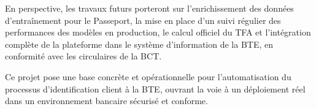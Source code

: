 \documentclass[12pt,a4paper]{report}
\begin{document}
En perspective, les travaux futurs porteront sur l'enrichissement des données d'entraînement pour le Passeport, la mise en place d'un suivi régulier des performances des modèles en production, le calcul officiel du TFA et l'intégration complète de la plateforme dans le système d'information de la BTE, en conformité avec les circulaires de la BCT.

Ce projet pose une base concrète et opérationnelle pour l'automatisation du processus d'identification client à la BTE, ouvrant la voie à un déploiement réel dans un environnement bancaire sécurisé et conforme.




\end{document}
